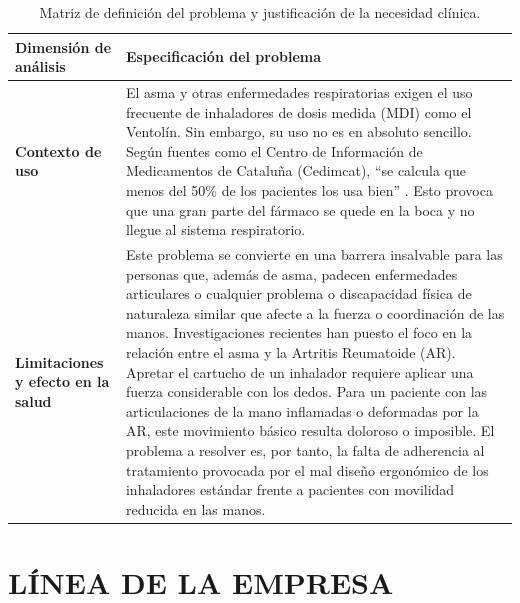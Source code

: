\documentclass[11pt,a4paper]{article}
\begin{document}
\renewcommand{\arraystretch}{1.6}
\begin{table}[H]
\centering\small
\begin{tabular}{|p{3.8cm}|p{10.2cm}|}
\hline
\rowcolor{ArthroNavy}
\textbf{\color{white}Dimensión de análisis} & \textbf{\color{white}Especificación del problema} \\
\hline
\textbf{Contexto de uso} & El asma y otras enfermedades respiratorias exigen el uso frecuente de inhaladores de dosis medida (MDI) como el Ventolín. Sin embargo, su uso no es en absoluto sencillo. Según fuentes como el Centro de Información de Medicamentos de Cataluña (Cedimcat), ``se calcula que menos del 50\% de los pacientes los usa bien'' \cite{cedimcat}. Esto provoca que una gran parte del fármaco se quede en la boca y no llegue al sistema respiratorio. \\
\hline
\textbf{Limitaciones y efecto en la salud} & Este problema se convierte en una barrera insalvable para las personas que, además de asma, padecen enfermedades articulares o cualquier problema o discapacidad física de naturaleza similar que afecte a la fuerza o coordinación de las manos. Investigaciones recientes han puesto el foco en la relación entre el asma y la Artritis Reumatoide (AR). Apretar el cartucho de un inhalador requiere aplicar una fuerza considerable con los dedos. Para un paciente con las articulaciones de la mano inflamadas o deformadas por la AR, este movimiento básico resulta doloroso o imposible. El problema a resolver es, por tanto, la falta de adherencia al tratamiento provocada por el mal diseño ergonómico de los inhaladores estándar frente a pacientes con movilidad reducida en las manos. \\
\hline
\end{tabular}
\caption{Matriz de definición del problema y justificación de la necesidad clínica.}
\end{table}


\section{LÍNEA DE LA EMPRESA}
\end{document}
